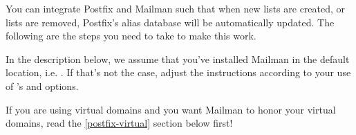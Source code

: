 \documentclass{howto}
\begin{document}
You can integrate Postfix and Mailman such that when new lists are created, or
lists are removed, Postfix's alias database will be automatically updated.
The following are the steps you need to take to make this work.

In the description below, we assume that you've installed Mailman in the
default location, i.e. .  If that's not the case,
adjust the instructions according to your use of 's
 and  options.

\begin{notice}[note]
If you are using virtual domains and you want Mailman to honor your virtual
domains, read the \ref{postfix-virtual} section below first!
\end{notice}
\end{document}
